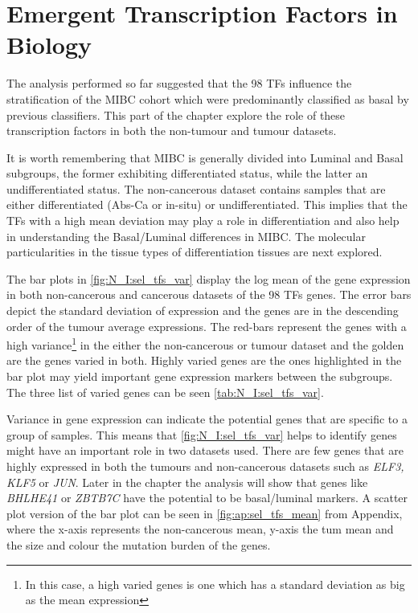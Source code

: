 \section{Emergent Transcription Factors in Biology} \label{s:N_I:sel_tfs_bio}

The analysis performed so far suggested that the 98 TFs influence the stratification of the MIBC cohort which were predominantly classified as basal by previous classifiers. This part of the chapter explore the role of these transcription factors in both the non-tumour and tumour datasets.


It is worth remembering that MIBC is generally divided into Luminal and Basal subgroups, the former exhibiting differentiated status, while the latter an undifferentiated status. The non-cancerous dataset contains samples that are either differentiated (Abs-Ca or in-situ) or undifferentiated. This implies that the TFs with a high mean deviation may play a role in differentiation and also help in understanding the Basal/Luminal differences in MIBC. The molecular particularities in the tissue types of differentiation tissues are next explored.


The bar plots in \cref{fig:N_I:sel_tfs_var} display the log mean of the gene expression in both non-cancerous and cancerous datasets of the 98 TFs genes. The error bars depict the standard deviation of expression and the genes are in the descending order of the tumour average expressions. The red-bars represent the genes with a high variance\footnote{In this case, a high varied genes is one which has a standard deviation as big as the mean expression} in the either the non-cancerous or tumour dataset and the golden are the genes varied in both. Highly varied genes are the ones highlighted in the bar plot may yield important gene expression markers between the subgroups. The three list of varied genes can be seen \cref{tab:N_I:sel_tfs_var}.


Variance in gene expression can indicate the potential genes that are specific to a group of samples. This means that \cref{fig:N_I:sel_tfs_var} helps to identify genes might have an important role in two datasets used. There are few genes that are highly expressed in both the tumours and non-cancerous datasets such as \textit{ELF3, KLF5} or \textit{JUN}. Later in the chapter the analysis will show that genes like \textit{BHLHE41} or \textit{ZBTB7C} have the potential to be basal/luminal markers. A scatter plot version of the bar plot can be seen in \cref{fig:ap:sel_tfs_mean} from Appendix, where the x-axis represents the non-cancerous mean, y-axis the tum mean and the size and colour the mutation burden of the genes.


